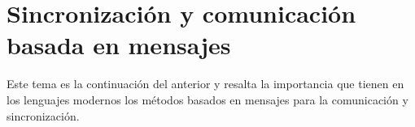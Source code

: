 \section{Sincronización y comunicación basada en mensajes}

Este tema es la continuación del anterior y resalta la importancia que tienen en
los lenguajes modernos los métodos basados en mensajes para la comunicación y
sincronización.
